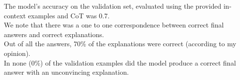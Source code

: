 The model's accuracy on the validation set, evaluated using the provided in-context examples and CoT was 0.7.\\
We note that there was a one to one correspondence between correct final answers and correct explanations.\\
Out of all the answers, 70\% of the explanations were correct (according to my opinion).\\
In none (0\%) of the validation examples did the model produce a correct final answer with an unconvincing explanation.